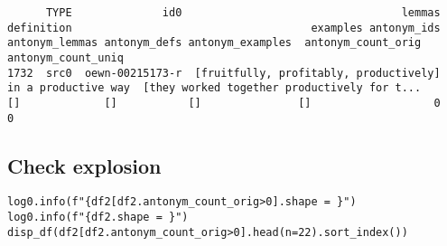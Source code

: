 \documentclass[a4paper,10pt,onecolumn,oneside,openright]{article}
\begin{document}
\begin{verbatim}
      TYPE              id0                                  lemmas           definition                                     examples antonym_ids antonym_lemmas antonym_defs antonym_examples  antonym_count_orig  antonym_count_uniq
1732  src0  oewn-00215173-r  [fruitfully, profitably, productively]  in a productive way  [they worked together productively for t...          []             []           []               []                   0                   0
\end{verbatim}

\subsection{Check explosion}
\label{sec:org9273351}
\begin{verbatim}
log0.info(f"{df2[df2.antonym_count_orig>0].shape = }")
log0.info(f"{df2.shape = }")
disp_df(df2[df2.antonym_count_orig>0].head(n=22).sort_index())
\end{verbatim}
\end{document}

